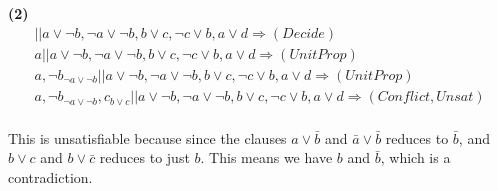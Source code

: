 \documentclass[11pt]{article}
\renewcommand{\part}[1] {\vspace{.10in} {\bf (#1)}}
\begin{document}
\part{2}
\begin{eqnarray*}
||a \vee \neg b, \neg a \vee \neg b, b \vee c, \neg c \vee b, a \vee d \Rightarrow (Decide)\\
a||a \vee \neg b, \neg a \vee \neg b, b \vee c, \neg c \vee b, a \vee d \Rightarrow (UnitProp)\\
a, \neg b_{\neg a \vee \neg b}||a \vee \neg b, \neg a \vee \neg b, b \vee c, \neg c \vee b, a \vee d \Rightarrow (UnitProp)\\
a, \neg b_{\neg a \vee \neg b}, c_{b \vee c}||a \vee \neg b, \neg a \vee \neg b, b \vee c, \neg c \vee b, a \vee d \Rightarrow (Conflict, Unsat)\\
\end{eqnarray*}

This is unsatisfiable because since the clauses $a \vee \bar b$ and $\bar a \vee \bar b$ reduces to $\bar b$, and $b \vee c$ and $b \vee \bar c$ reduces to just $b$. This means we have $b$ and $\bar b$, which is a contradiction. 
\end{document}
